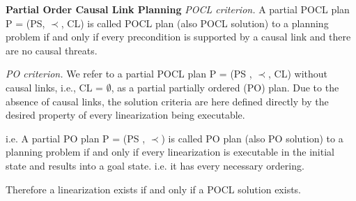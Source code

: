 \textbf{Partial Order Causal Link Planning}
\emph{POCL criterion.} A partial POCL plan P = (PS, $\prec$, CL) is called POCL plan (also POCL solution) to a planning problem if and only if every precondition is supported by a causal link and there are no causal threats.

\emph{PO criterion.} We refer to a partial POCL plan P = (PS , $\prec$, CL) without causal links, i.e., CL = $\emptyset$, as a partial partially ordered (PO) plan. Due to the absence of causal links, the solution criteria are here defined directly by the desired property of every linearization being executable.

i.e. A partial PO plan P = (PS , $\prec$) is called PO plan (also PO solution) to a planning problem if and only
if every linearization is executable in the initial state and results into a goal state.
i.e. it has every necessary ordering.

Therefore a linearization exists if and only if a POCL solution exists.